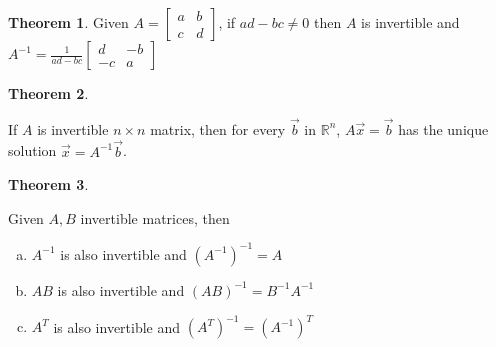 \documentclass[a4paper,12pt]{article}
\theoremstyle{definition}
\newtheorem{theorem}{Theorem}
\theoremstyle{definition}
\newcommand{\mateq}[3]{#1#2 = #3}
\newcommand{\mateqaxb}{\mateq{A}{\vec{x}}{\vec{b}}}
\begin{document}
	\begin{theorem}
		\label{thm:two-by-two-mat-invert-thm}
		Given $A
		=
		\begin{bmatrix}
			a & b\\
			c & d
		\end{bmatrix}$,
		if $ad - bc \neq 0$ then $A$ is invertible and $A^{-1} = \frac{1}{ad-bc}
		\begin{bmatrix}
			d & -b\\
			-c & a
		\end{bmatrix}$
	\end{theorem}
	
	\begin{theorem}
		\label{thm:invert-mat-unique-soln-thm}
		
		If $A$ is invertible $n \times n$ matrix, then for every $\vec{b}$ in $\mathbb{R}^n$, $\mateqaxb$ has the unique solution $\vec{x} = A^{-1}\vec{b}$.
	\end{theorem}
	
	\begin{theorem}
		\label{thm:invert-mat-algebra}
		
		Given $A, B$ invertible matrices, then
		\begin{enumerate}[a.]
			\item $A^{-1}$ is also invertible and $(A^{-1})^{-1} = A$
			
			\item $AB$ is also invertible and $(AB)^{-1} = B^{-1}A^{-1}$
			
			\item $A^T$ is also invertible and $(A^T)^{-1} = (A^{-1})^T$
		\end{enumerate}
	\end{theorem}
	
\end{document}
